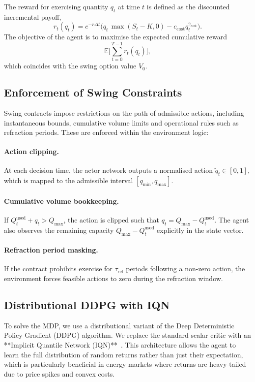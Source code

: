 \documentclass[a4paper,fleqn]{cas-dc}
\begin{document}
The reward for exercising quantity $q_t$ at time $t$ is defined as the discounted incremental payoff,
\[
r_t(q_t)
=
e^{-r\Delta t}
\Big(
q_t \, \max(S_t - K, 0)
 - c_{\mathrm{cost}} q_t^{\gamma_{\mathrm{cost}}}
\Big).
\]
The objective of the agent is to maximise the expected cumulative reward
\[
\mathbb{E}\Bigg[
\sum_{t=0}^{T-1} r_t(q_t)
\Bigg],
\]
which coincides with the swing option value $V_0$.

\subsection{Enforcement of Swing Constraints}

Swing contracts impose restrictions on the path of admissible actions, including instantaneous bounds, cumulative volume limits and operational rules such as refraction periods. These are enforced within the environment logic:

\paragraph{Action clipping.}
At each decision time, the actor network outputs a normalised action $\tilde{q}_t \in [0,1]$, which is mapped to the admissible interval $[q_{\min},q_{\max}]$.

\paragraph{Cumulative volume bookkeeping.}
If $Q^{\mathrm{used}}_t + q_t > Q_{\max}$, the action is clipped such that $q_t = Q_{\max} - Q^{\mathrm{used}}_t$. The agent also observes the remaining capacity $Q_{\max} - Q^{\mathrm{used}}_t$ explicitly in the state vector.

\paragraph{Refraction period masking.}
If the contract prohibits exercise for $\tau_{\mathrm{ref}}$ periods following a non-zero action, the environment forces feasible actions to zero during the refraction window.

\subsection{Distributional DDPG with IQN}

To solve the MDP, we use a distributional variant of the Deep Deterministic Policy Gradient (DDPG) algorithm. We replace the standard scalar critic with an **Implicit Quantile Network (IQN)**~\cite{dabney2018implicit}. This architecture allows the agent to learn the full distribution of random returns rather than just their expectation, which is particularly beneficial in energy markets where returns are heavy-tailed due to price spikes and convex costs.
\end{document}
